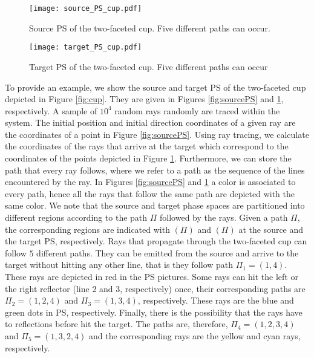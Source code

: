 \begin{figure}[h]
  \begin{minipage}[]{0.49\textwidth}
\centering
    \texttt{[image: source\_PS\_cup.pdf]}
    \caption{Source PS of the two-faceted cup. Five different paths can occur.}
    \label{fig:sourcePS}
  \end{minipage} 
\hspace{0.2cm}
  \begin{minipage}[]{0.49\textwidth}
\centering
    \texttt{[image: target\_PS\_cup.pdf]}
  \caption{Target PS of the two-faceted cup. Five different paths can occur}  
   \label{fig:targetPS}
 \end{minipage}
\end{figure}
To provide an example, we show the source and target PS of the two-faceted cup depicted in Figure \ref{fig:cup}. 
They are given in Figures \ref{fig:sourcePS} and \ref{fig:targetPS}, respectively. 
A sample of $10^4$ random rays randomly are traced within the system. The initial position and initial direction coordinates of a given ray are the coordinates of a point in 
Figure \ref{fig:sourcePS}.
Using ray tracing, we calculate the coordinates of the rays that arrive at the target which correspond 
to the coordinates of the points depicted in Figure \ref{fig:targetPS}. 
Furthermore, we can store the path that every ray follows, where we refer to a path as the sequence of the lines encountered by the ray. 
In Figures \ref{fig:sourcePS} and \ref{fig:targetPS} a color is associated to every path, hence all the rays that follow the same path are depicted with the same color. 
We note that the source and target phase spaces are partitioned into different regions according to the path $\Pi$ followed by the rays. 
Given a path $\Pi$, the corresponding regions are indicated with $(\Pi)$ and $(\Pi)$ at the source and the target PS, respectively. 
Rays that propagate through the two-faceted cup can follow $5$ different paths. They can be emitted from the source and arrive to the target without hitting any other line, that is they follow path $\Pi_1= (1,4)$. These rays are depicted in red in the PS pictures. Some rays can hit the left or the right reflector (line $2$ and $3$, respectively) once, their corresponding paths are $\Pi_2 = (1,2,4)$ and $\Pi_3 = (1,3,4)$, respectively. These rays are the blue and green dots in PS, respectively. Finally, there is the possibility that the rays have to reflections before hit the target. The paths are, therefore, $\Pi_4 = (1,2,3,4)$ and $\Pi_5 = (1,3,2,4)$ and the corresponding rays are the yellow and cyan rays, respectively.  
